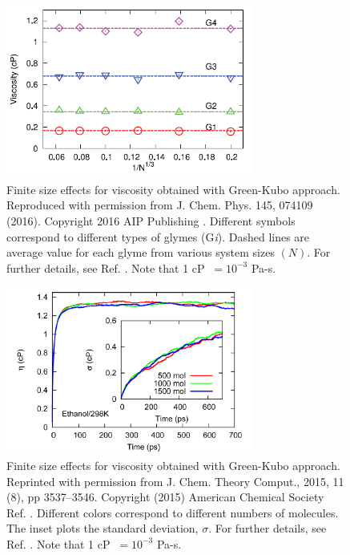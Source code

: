 \documentclass[9pt,bestpractices]{livecoms}
\providecommand{\DIFaddend}{} %
\begin{document}
\DIFaddend

\begin{figure}[htb!]
	\centering
	\includegraphics[width=3.2in]{MoultosFig3.png}
	\caption{Finite size effects for viscosity obtained with Green-Kubo approach. Reproduced with permission from J. Chem. Phys. 145, 074109 (2016). Copyright 2016 AIP Publishing \cite{Moultos2016}.  Different symbols correspond to different types of glymes (G\textit{i}). Dashed lines are average value for each glyme from various system sizes $(N)$. For further details, see Ref. \cite{Moultos2016}. Note that 1 cP $\ = 10^{-3}$ Pa-s.}
	\label{fig:MoultosFig3}
\end{figure}

\begin{figure}[htb!]
	\centering
	\includegraphics[width=3.2in]{ZhangFig9.png}
	\caption{Finite size effects for viscosity obtained with Green-Kubo approach. Reprinted with permission from J. Chem. Theory Comput., 2015, 11 (8), pp 3537–3546. Copyright (2015) American Chemical Society  Ref. \cite{Zhang2015}. Different colors correspond to different numbers of molecules. The inset plots the standard deviation, $\sigma$. For further details, see Ref. \cite{Zhang2015}. Note that 1 cP $\ = 10^{-3}$ Pa-s.}
	\label{fig:ZhangFig9}
\end{figure}
\end{document}
